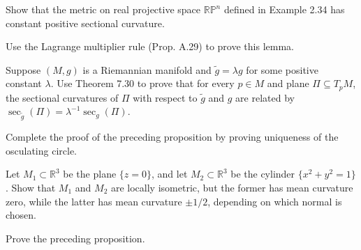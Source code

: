 \begin{exercise}
\label{exer:constant-sectional-curvature-rp}
Show that the metric on real projective space $\mathbb{RP}^n$ defined in Example 2.34 has constant positive sectional curvature.
\end{exercise}

\begin{exercise}
\label{exer:lagrange-multiplier-eigenvector}
Use the Lagrange multiplier rule (Prop. A.29) to prove this lemma.
\end{exercise}

\begin{exercise}
\label{exer:metric-scaling-sectional-curvature}
Suppose $(M,g)$ is a Riemannian manifold and $\tilde{g} = \lambda g$ for some positive constant $\lambda$. Use Theorem 7.30 to prove that for every $p \in M$ and plane $\Pi \subseteq T_p M$, the sectional curvatures of $\Pi$ with respect to $\tilde{g}$ and $g$ are related by $\sec_{\tilde{g}}(\Pi) = \lambda^{-1} \sec_g(\Pi)$.
\end{exercise}

\begin{exercise}
\label{exer:osculating-circle-uniqueness}
Complete the proof of the preceding proposition by proving uniqueness of the osculating circle.
\end{exercise}

\begin{exercise}
\label{exer:plane-cylinder-isometric}
Let $M_1 \subset \mathbb{R}^3$ be the plane $\{z = 0\}$, and let $M_2 \subset \mathbb{R}^3$ be the cylinder $\{x^2 + y^2 = 1\}$. Show that $M_1$ and $M_2$ are locally isometric, but the former has mean curvature zero, while the latter has mean curvature $\pm 1/2$, depending on which normal is chosen.
\end{exercise}

\begin{exercise}
\label{exer:prove-normal-connection}
Prove the preceding proposition.
\end{exercise}

